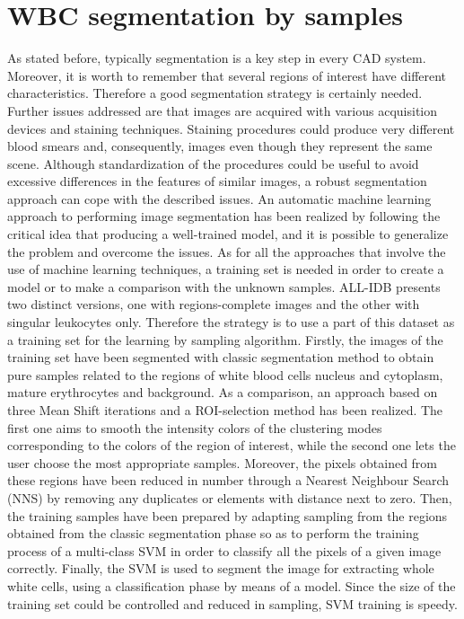 \documentclass[final,a4paper,12pt,english]{UnicaPhdThesis3}
\begin{document}
{\section{WBC segmentation by samples} 
\label{iciap_caip_2015}
As stated before, typically segmentation is a key step in every CAD system. Moreover, it is worth to remember that several regions of interest have different characteristics. Therefore a good segmentation strategy is certainly needed.
Further issues addressed are that images are acquired with various acquisition devices and staining techniques. Staining procedures could produce very different blood smears and, consequently, images even though they represent the same scene. Although standardization of the procedures could be useful to avoid excessive differences in the features of similar images, a robust segmentation approach can cope with the described issues. An automatic machine learning approach to performing image segmentation has been realized by following the critical idea that producing a well-trained model, and it is possible to generalize the problem and overcome the issues. As for all the approaches that involve the use of machine learning techniques, a training set is needed in order to create a model or to make a comparison with the unknown samples. ALL-IDB presents two distinct versions, one with regions-complete images and the other with singular leukocytes only. Therefore the strategy is to use a part of this dataset as a training set for the learning by sampling algorithm. Firstly, the images of the training set have been segmented with classic segmentation method to obtain pure samples related to the regions of white blood cells nucleus and cytoplasm, mature erythrocytes and background. As a comparison, an approach based on three Mean Shift iterations and a ROI-selection method has been realized. The first one aims to smooth the intensity colors of the clustering modes corresponding to the colors of the region of interest, while the second one lets the user choose the most appropriate samples.
Moreover, the pixels obtained from these regions have been reduced in number through a Nearest Neighbour Search (NNS) by removing any duplicates or elements with distance next to zero. Then, the training samples have been prepared by adapting sampling from the regions obtained from the classic segmentation phase so as to perform the training process of a multi-class SVM in order to classify all the pixels of a given image correctly. Finally, the SVM is used to segment the image for extracting whole white cells, using a classification phase by means of a model. Since the size of the training set could be controlled and reduced in sampling, SVM training is speedy.

}
\end{document}
